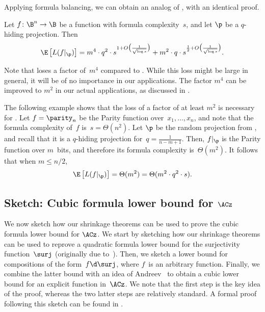\documentclass{toc}
\begin{document}
Applying formula balancing, we can obtain an analog of 
,
with an identical proof. 
\begin{corollary}
\label{cor:shrinkage-without-depth-hiding} Let $f\colon\B^{n}\to\B$
be a function with formula complexity~$s$, and let $\p$ be a $q$-hiding
projection. Then 
\[
\E\left[L(f|_{\p})\right]=m^{4}\cdot q^{2}\cdot s^{1+O\bigl(\frac{1}{\sqrt{\log s}}\bigr)}+m^{2}\cdot q\cdot s^{\frac{1}{2}+O\bigl(\frac{1}{\sqrt{\log s}}\bigr)}.
\]
\end{corollary}

\begin{remark}
Note that  
loses a factor of~$m^{4}$ compared
to . While 
this loss might be large in general,
it will be of no importance in our applications. The factor $m^{4}$
can be improved to $m^{2}$ in our actual applications, as discussed
in %
.  %

The following example shows that the loss of a factor of at least
$m^{2}$ is necessary for . 
Let $f=\parity_{n}$
be the Parity function over~$x_{1},\ldots,x_{n}$, and note that
the formula complexity of~$f$ is~$s=\Theta(n^{2})$. Let $\p$
be the random projection from , and
recall that it is a $q$-hiding projection for~$q=\frac{1}{n-m+1}$.
Then, $f|_{\p}$ is the Parity function over $m$~bits, and therefore
its formula complexity is~$\Theta(m^{2})$. It follows that when
$m\leq n/2$, 
\[
\E\left[L(f|_{\p})\right]=\Theta(m^{2})=\Theta(m^{2}\cdot q^{2}\cdot s).
\]
\end{remark}


\subsection{\label{subsec:application-sketch}Sketch: Cubic formula lower bound
for \texorpdfstring{$\protect\ACz$}{AC0}}

We now sketch how our shrinkage theorems can be used to prove the
cubic formula lower bound for $\ACz$. We start by sketching how our
shrinkage theorems can be used to reprove a quadratic formula lower
bound for the surjectivity function~$\surj$ (originally due to~\cite{BM12}).
Then, we sketch a lower bound for compositions of the form~$f\d\surj$,
where $f$~is an arbitrary function. Finally, we combine the latter
bound with an idea of Andreev~\cite{A87} to obtain a cubic lower
bound for an explicit function in~$\ACz$. We note that the first
step is the key idea of the proof, whereas the two latter steps are
relatively standard. A formal proof following this sketch can be found
in .
\end{document}
